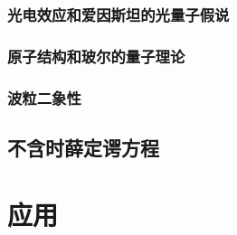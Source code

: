 \documentclass[zihao=-4]{ctexbook}
\begin{document}
\section{光电效应和爱因斯坦的光量子假说}

\section{原子结构和玻尔的量子理论}

\section{波粒二象性}

\chapter{不含时薛定谔方程}

\part{应\qquad 用}
\end{document}
